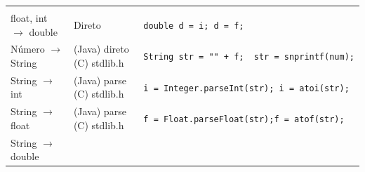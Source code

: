 \documentclass[12pt,a4paper]{article}
\begin{document}
\begin{longtable}[]{@{}lll@{}}
\begin{minipage}[t]{0.48\columnwidth}
\end{minipage}\tabularnewline
\begin{minipage}[t]{0.21\columnwidth}\raggedright
float, int \(\rightarrow\) double\strut
\end{minipage} & \begin{minipage}[t]{0.22\columnwidth}\raggedright
Direto\strut
\end{minipage} & \begin{minipage}[t]{0.48\columnwidth}\raggedright
\texttt{double\ d\ =\ i;\ d\ =\ f;}\strut
\end{minipage}\tabularnewline
\begin{minipage}[t]{0.21\columnwidth}\raggedright
Número \(\rightarrow\) String\strut
\end{minipage} & \begin{minipage}[t]{0.22\columnwidth}\raggedright
(Java) direto (C) stdlib.h\strut
\end{minipage} & \begin{minipage}[t]{0.48\columnwidth}\raggedright
\texttt{String\ str\ =\ ""\ +\ f;\ \ str\ =\ snprintf(num);}\strut
\end{minipage}\tabularnewline
\begin{minipage}[t]{0.21\columnwidth}\raggedright
String \(\rightarrow\) int\strut
\end{minipage} & \begin{minipage}[t]{0.22\columnwidth}\raggedright
(Java) parse (C) stdlib.h\strut
\end{minipage} & \begin{minipage}[t]{0.48\columnwidth}\raggedright
\texttt{i\ =\ Integer.parseInt(str);\ i\ =\ atoi(str);}\strut
\end{minipage}\tabularnewline
\begin{minipage}[t]{0.21\columnwidth}\raggedright
String \(\rightarrow\) float\strut
\end{minipage} & \begin{minipage}[t]{0.22\columnwidth}\raggedright
(Java) parse (C) stdlib.h\strut
\end{minipage} & \begin{minipage}[t]{0.48\columnwidth}\raggedright
\texttt{f\ =\ Float.parseFloat(str);f\ =\ atof(str);}\strut
\end{minipage}\tabularnewline
\begin{minipage}[t]{0.21\columnwidth}\raggedright
String \(\rightarrow\) double\strut
\end{minipage} & \begin{minipage}[t]{0.22\columnwidth}\raggedright

\end{minipage}
\end{longtable}
\end{document}
